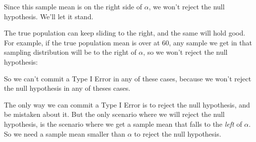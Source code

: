 \documentclass[../../../main.tex]{subfiles}
\begin{document}
\noindent
Since this sample mean is on the right side of $\alpha$, we won't reject the null hypothesis. We'll let it stand. 

The true population can keep sliding to the right, and the same will hold good. For example, if the true population mean is over at 60, any sample we get in that sampling distribution will be to the right of $\alpha$, so we won't reject the null hypothesis:

\begin{center}
\end{center}

\noindent
So we can't commit a Type I Error in any of these cases, because we won't reject the null hypothesis in any of theses cases. 

The only way we can commit a Type I Error is to reject the null hypothesis, and be mistaken about it. But the only scenario where we will reject the null hypothesis, is the scenario where we get a sample mean that falls to the \emph{left} of $\alpha$. So we need a sample mean smaller than $\alpha$ to reject the null hypothesis.
\end{document}
